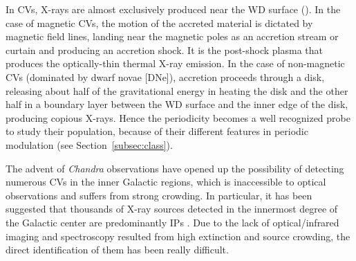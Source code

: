 \documentclass[fleqn,usenatbib]{mnras}
\begin{document}
In CVs, X-rays are almost exclusively produced near the WD surface (\citealp{2001cvs..book.....H, 2017PASP..129f2001M}). 
In the case of magnetic CVs, the motion of the accreted material is dictated by magnetic field lines, landing near the magnetic poles as an accretion stream or curtain and producing an accretion shock. It is the post-shock plasma that produces the optically-thin thermal X-ray emission. 
In the case of non-magnetic CVs (dominated by dwarf novae [DNe]), accretion proceeds through a disk, releasing about half of the gravitational energy in heating the disk and the other half in a boundary layer between the WD surface and the inner edge of the disk, producing copious X-rays.    
Hence the periodicity becomes a well recognized probe to study their population, because of their different features in periodic modulation (see Section~\ref{subsec:class}). 

The advent of {\it Chandra} observations have opened up the possibility of detecting numerous CVs in the inner Galactic regions, which is inaccessible to optical observations and suffers from strong crowding. 
In particular, it has been suggested that thousands of X-ray sources detected in the innermost degree of the Galactic center are predominantly IPs \citep{2009ApJS..181..110M,2018ApJS..235...26Z}. Due to the lack of optical/infrared imaging and spectroscopy resulted from high extinction and source crowding, the direct identification of them has been really difficult.


\end{document}
